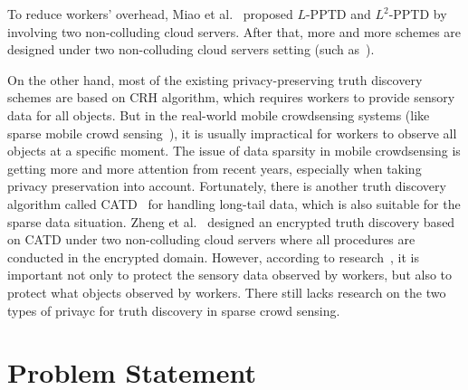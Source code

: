 \documentclass[conference]{IEEEtran}
\begin{document}
To reduce workers' overhead, Miao et al.~\cite{miao_lightweight_2017} proposed $L$-PPTD and $L^2$-PPTD by involving two non-colluding cloud servers.
After that, more and more schemes are designed under two non-colluding cloud servers setting (such as~\cite{zhang_lptd_2019,zhang_reliable_2019,xue_inpptd_2020,tang_achieving_2021}).

On the other hand, most of the existing privacy-preserving truth discovery schemes are based on CRH algorithm, which requires workers to provide sensory data for all objects.
But in the real-world mobile crowdsensing systems (like sparse mobile crowd sensing~\cite{wang_sparse_2016}), it is usually impractical for workers to observe all objects at a specific moment.
The issue of data sparsity in mobile crowdsensing is getting more and more attention from recent years, especially when taking privacy preservation into account.
Fortunately, there is another truth discovery algorithm called CATD~\cite{li_confidence-aware_2014} for handling long-tail data, which is also suitable for the sparse data situation.
Zheng et al.~\cite{zheng_learning_2018} designed an encrypted truth discovery based on CATD under two non-colluding cloud servers where all procedures are conducted in the encrypted domain.
However, according to research~\cite{wang_sparse_2020}, it is important not only to protect the sensory data observed by workers, but also to protect what objects observed by workers.
There still lacks research on the two types of privayc for truth discovery in sparse crowd sensing.

\section{Problem Statement}
\end{document}
